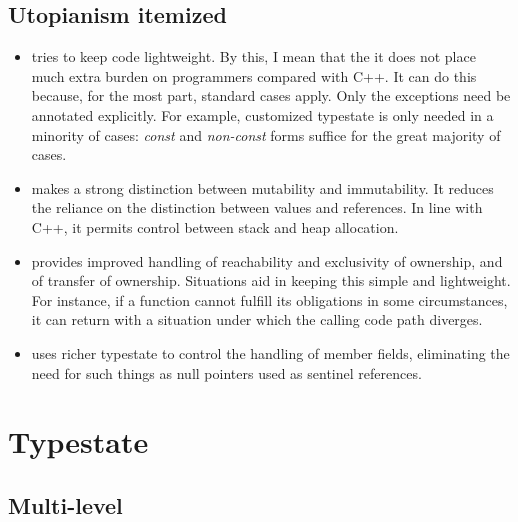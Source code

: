 \documentclass[10pt]{amsart}
\begin{document}
\subsection{Utopianism itemized}


\begin{itemize}
\item \Utop tries to keep code lightweight.  By this, I mean that the
  it does not place much extra burden on programmers compared with
  C++\@.  It can do this because, for the most part, standard cases
  apply.  Only the exceptions need be annotated explicitly.  For
  example, customized typestate is only needed in a minority of cases:
  \emph{const} and \emph{non-const} forms suffice for the great
  majority of cases.
\item \Utop makes a strong distinction between mutability and
  immutability.  It reduces the reliance on the distinction between
  values and references.  In line with C++, it permits control between
  stack and heap allocation.
\item \Utop provides improved handling of reachability and exclusivity
  of ownership, and of transfer of ownership.  Situations aid in
  keeping this simple and lightweight.  For instance, if a function
  cannot fulfill its obligations in some circumstances, it can return
  with a situation under which the calling code path diverges.
\item \Utop uses richer typestate to control the handling of member
  fields, eliminating the need for such things as null pointers used
  as sentinel references.
\end{itemize}




\section{Typestate}


\subsection{Multi-level}
\end{document}
